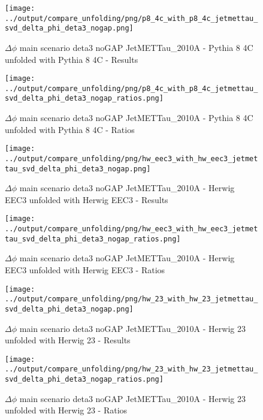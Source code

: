 \documentclass[11pt]{book}
\begin{document}
\begin{figure}[ht]
\centering
\texttt{[image: ../output/compare\_unfolding/png/p8\_4c\_with\_p8\_4c\_jetmettau\_svd\_delta\_phi\_deta3\_nogap.png]}
\caption{$\Delta\phi$ main scenario deta3 noGAP JetMETTau\_2010A - Pythia 8 4C unfolded with Pythia 8 4C - Results}
\label{p8_p8_jetmettau_svd_delta_phi_deta3_nogap_a}
\end{figure}

\begin{figure}[ht]
\centering
\texttt{[image: ../output/compare\_unfolding/png/p8\_4c\_with\_p8\_4c\_jetmettau\_svd\_delta\_phi\_deta3\_nogap\_ratios.png]}
\caption{$\Delta\phi$ main scenario deta3 noGAP JetMETTau\_2010A - Pythia 8 4C unfolded with Pythia 8 4C - Ratios}
\label{p8_p8_jetmettau_svd_delta_phi_deta3_nogap_b}
\end{figure}

\begin{figure}[ht]
\centering
\texttt{[image: ../output/compare\_unfolding/png/hw\_eec3\_with\_hw\_eec3\_jetmettau\_svd\_delta\_phi\_deta3\_nogap.png]}
\caption{$\Delta\phi$ main scenario deta3 noGAP JetMETTau\_2010A - Herwig EEC3 unfolded with Herwig EEC3 - Results}
\label{hw_eec3_hw_eec3_jetmettau_svd_delta_phi_deta3_nogap_a}
\end{figure}

\begin{figure}[ht]
\centering
\texttt{[image: ../output/compare\_unfolding/png/hw\_eec3\_with\_hw\_eec3\_jetmettau\_svd\_delta\_phi\_deta3\_nogap\_ratios.png]}
\caption{$\Delta\phi$ main scenario deta3 noGAP JetMETTau\_2010A - Herwig EEC3 unfolded with Herwig EEC3 - Ratios}
\label{hw_eec3_hw_eec3_jetmettau_svd_delta_phi_deta3_nogap_b}
\end{figure}

\begin{figure}[ht]
\centering
\texttt{[image: ../output/compare\_unfolding/png/hw\_23\_with\_hw\_23\_jetmettau\_svd\_delta\_phi\_deta3\_nogap.png]}
\caption{$\Delta\phi$ main scenario deta3 noGAP JetMETTau\_2010A - Herwig 23 unfolded with Herwig 23 - Results}
\label{hw_23_hw_23_jetmettau_svd_delta_phi_deta3_nogap_a}
\end{figure}

\begin{figure}[ht]
\centering
\texttt{[image: ../output/compare\_unfolding/png/hw\_23\_with\_hw\_23\_jetmettau\_svd\_delta\_phi\_deta3\_nogap\_ratios.png]}
\caption{$\Delta\phi$ main scenario deta3 noGAP JetMETTau\_2010A - Herwig 23 unfolded with Herwig 23 - Ratios}
\label{hw_23_hw_23_jetmettau_svd_delta_phi_deta3_nogap_b}
\end{figure}
\end{document}

